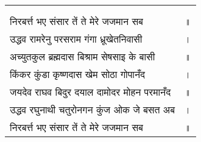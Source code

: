 {
{\bfseries
\setlength{\mylenone}{0pt}
\settowidth{\mylentwo}{}
\setlength{\mylenone}{\maxof{\mylenone}{\mylentwo}}
\settowidth{\mylentwo}{निरबर्त्त भए संसार तें ते मेरे जजमान सब}
\setlength{\mylenone}{\maxof{\mylenone}{\mylentwo}}
\settowidth{\mylentwo}{उद्धव रामरेनु परसराम गंगा ध्रूखेतनिवासी}
\setlength{\mylenone}{\maxof{\mylenone}{\mylentwo}}
\settowidth{\mylentwo}{अच्युतकुल ब्रह्मदास बिश्राम सेषसाइ के बासी}
\setlength{\mylenone}{\maxof{\mylenone}{\mylentwo}}
\settowidth{\mylentwo}{किंकर कुंडा कृष्णदास खेम सोठा गोपानँद}
\setlength{\mylenone}{\maxof{\mylenone}{\mylentwo}}
\settowidth{\mylentwo}{जयदेव राघव बिदुर दयाल दामोदर मोहन परमानँद}
\setlength{\mylenone}{\maxof{\mylenone}{\mylentwo}}
\settowidth{\mylentwo}{उद्धव रघुनाथी चतुरोनगन कुंज ओक जे बसत अब}
\setlength{\mylenone}{\maxof{\mylenone}{\mylentwo}}
\settowidth{\mylentwo}{निरबर्त्त भए संसार तें ते मेरे जजमान सब}
\setlength{\mylenone}{\maxof{\mylenone}{\mylentwo}}
\setlength{\mylentwo}{\baselineskip}
\setlength{\mylenone}{\mylenone + 1pt}
\begin{longtable}[l]{@{\hspace*{\mylen}}>{\setlength\parfillskip{0pt}}p{\mylenone}@{}@{}l@{}}
 & \\[-\the\mylentwo]
\centering{॥ १४७ \hspace*{-1.5mm}॥} & \\ \nopagebreak
निरबर्त्त भए संसार तें ते मेरे जजमान सब & ॥\\
उद्धव रामरेनु परसराम गंगा ध्रूखेतनिवासी & ।\\ \nopagebreak
अच्युतकुल ब्रह्मदास बिश्राम सेषसाइ के बासी & ॥\\
किंकर कुंडा कृष्णदास खेम सोठा गोपानँद & ।\\ \nopagebreak
जयदेव राघव बिदुर दयाल दामोदर मोहन परमानँद & ॥\\
उद्धव रघुनाथी चतुरोनगन कुंज ओक जे बसत अब & ।\\ \nopagebreak
निरबर्त्त भए संसार तें ते मेरे जजमान सब & ॥
\end{longtable}
}
}
